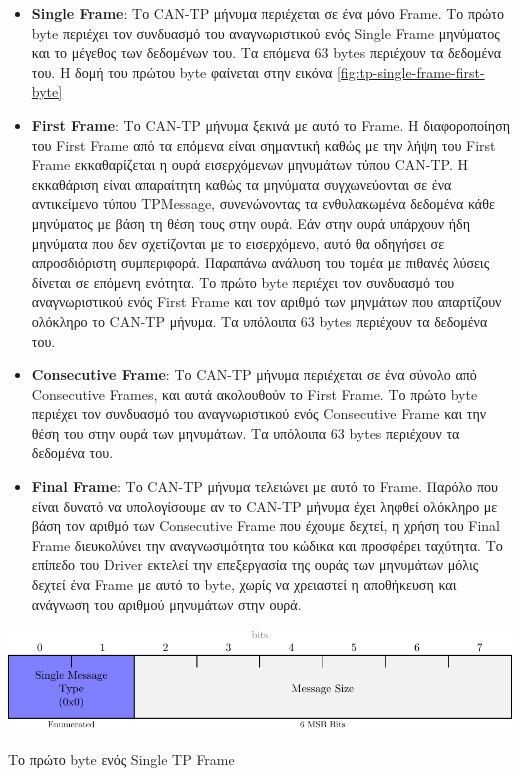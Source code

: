 \documentclass[a4paper,nobib,justified]{tufte-book}
\begin{document}
\begin{itemize}
	\item \textbf{Single Frame}: Το CAN-TP μήνυμα περιέχεται σε ένα μόνο Frame. Το πρώτο byte περιέχει τον συνδυασμό του αναγνωριστικού ενός Single Frame μηνύματος και το μέγεθος των δεδομένων του. Τα επόμενα 63 bytes περιέχουν τα δεδομένα του. Η δομή του πρώτου byte φαίνεται στην εικόνα \ref{fig:tp-single-frame-first-byte}
	\item \textbf{First Frame}: Το CAN-TP μήνυμα ξεκινά με αυτό το Frame. Η διαφοροποίηση του First Frame από τα επόμενα είναι σημαντική καθώς με την λήψη του First Frame εκκαθαρίζεται η ουρά εισερχόμενων μηνυμάτων τύπου CAN-TP. Η εκκαθάριση είναι απαραίτητη καθώς τα μηνύματα συγχωνεύονται σε ένα αντικείμενο τύπου TPMessage, συνενώνοντας τα ενθυλακωμένα δεδομένα κάθε μηνύματος με βάση τη θέση τους στην ουρά. Εάν στην ουρά υπάρχουν ήδη μηνύματα που δεν σχετίζονται με το εισερχόμενο, αυτό θα οδηγήσει σε απροσδιόριστη συμπεριφορά. Παραπάνω ανάλυση του τομέα με πιθανές λύσεις δίνεται σε επόμενη ενότητα. Το πρώτο byte περιέχει τον συνδυασμό του αναγνωριστικού ενός First Frame και τον αριθμό των μηνμάτων που απαρτίζουν ολόκληρο το CAN-TP μήνυμα. Τα υπόλοιπα 63 bytes περιέχουν τα δεδομένα του.
	\item \textbf{Consecutive Frame}: Το CAN-TP μήνυμα περιέχεται σε ένα σύνολο από Consecutive Frames, και αυτά ακολουθούν το First Frame. Το πρώτο byte περιέχει τον συνδυασμό του αναγνωριστικού ενός Consecutive Frame και την θέση του στην ουρά των μηνυμάτων. Τα υπόλοιπα 63 bytes περιέχουν τα δεδομένα του.
	\item \textbf{Final Frame}: Το CAN-TP μήνυμα τελειώνει με αυτό το Frame. Παρόλο που είναι δυνατό να υπολογίσουμε αν το CAN-TP μήνυμα έχει ληφθεί ολόκληρο με βάση τον αριθμό των Consecutive Frame που έχουμε δεχτεί, η χρήση του Final Frame διευκολύνει την αναγνωσιμότητα του κώδικα και προσφέρει ταχύτητα. Το επίπεδο του Driver εκτελεί την επεξεργασία της ουράς των μηνυμάτων μόλις δεχτεί ένα Frame με αυτό το byte, χωρίς να χρειαστεί η αποθήκευση και ανάγνωση του αριθμού μηνυμάτων στην ουρά. 
\end{itemize}

\begin{marginfigure}
	\includegraphics[width=\textwidth]{media/diagrams/tp-messages/single-message-first-byte.pdf}
	\caption{Το πρώτο byte ενός Single TP Frame}
	\label{fig:tp-single-frame-first-byte}
\end{marginfigure}
\end{document}
